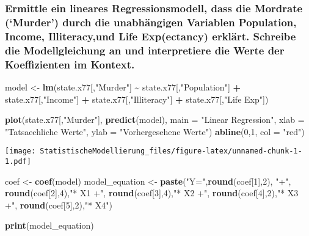 \documentclass[
]{article}
\newenvironment{Shaded}{\begin{snugshade}}{\end{snugshade}}
\newcommand{\AttributeTok}[1]{\textcolor[rgb]{0.13,0.29,0.53}{#1}}
\newcommand{\DecValTok}[1]{\textcolor[rgb]{0.00,0.00,0.81}{#1}}
\newcommand{\FunctionTok}[1]{\textcolor[rgb]{0.13,0.29,0.53}{\textbf{#1}}}
\newcommand{\NormalTok}[1]{#1}
\newcommand{\OtherTok}[1]{\textcolor[rgb]{0.56,0.35,0.01}{#1}}
\newcommand{\SpecialCharTok}[1]{\textcolor[rgb]{0.81,0.36,0.00}{\textbf{#1}}}
\newcommand{\StringTok}[1]{\textcolor[rgb]{0.31,0.60,0.02}{#1}}
\begin{document}
\subsubsection{Ermittle ein lineares Regressionsmodell, dass die
Mordrate (`Murder') durch die unabhängigen Variablen Population, Income,
Illiteracy,und Life Exp(ectancy) erklärt. Schreibe die Modellgleichung
an und interpretiere die Werte der Koeffizienten im
Kontext.}\label{ermittle-ein-lineares-regressionsmodell-dass-die-mordrate-murder-durch-die-unabhuxe4ngigen-variablen-population-income-illiteracyund-life-expectancy-erkluxe4rt.-schreibe-die-modellgleichung-an-und-interpretiere-die-werte-der-koeffizienten-im-kontext.}

\begin{Shaded}
\begin{Highlighting}[]
\NormalTok{model }\OtherTok{\textless{}{-}}  \FunctionTok{lm}\NormalTok{(state.x77[,}\StringTok{"Murder"}\NormalTok{] }\SpecialCharTok{\textasciitilde{}}\NormalTok{ state.x77[,}\StringTok{"Population"}\NormalTok{] }\SpecialCharTok{+}\NormalTok{ state.x77[,}\StringTok{"Income"}\NormalTok{] }\SpecialCharTok{+}\NormalTok{ state.x77[,}\StringTok{"Illiteracy"}\NormalTok{] }\SpecialCharTok{+}\NormalTok{ state.x77[,}\StringTok{"Life Exp"}\NormalTok{])}

\FunctionTok{plot}\NormalTok{(state.x77[,}\StringTok{"Murder"}\NormalTok{], }\FunctionTok{predict}\NormalTok{(model), }\AttributeTok{main =} \StringTok{"Linear Regression"}\NormalTok{, }\AttributeTok{xlab =} \StringTok{"Tatsaechliche Werte"}\NormalTok{, }\AttributeTok{ylab =} \StringTok{"Vorhergesehene Werte"}\NormalTok{)}
\FunctionTok{abline}\NormalTok{(}\DecValTok{0}\NormalTok{,}\DecValTok{1}\NormalTok{, }\AttributeTok{col =} \StringTok{"red"}\NormalTok{)}
\end{Highlighting}
\end{Shaded}

\texttt{[image: StatistischeModellierung\_files/figure-latex/unnamed-chunk-1-1.pdf]}

\begin{Shaded}
\begin{Highlighting}[]
\NormalTok{coef }\OtherTok{\textless{}{-}} \FunctionTok{coef}\NormalTok{(model)}
\NormalTok{model\_equation }\OtherTok{\textless{}{-}} \FunctionTok{paste}\NormalTok{(}\StringTok{"Y="}\NormalTok{,}\FunctionTok{round}\NormalTok{(coef[}\DecValTok{1}\NormalTok{],}\DecValTok{2}\NormalTok{), }\StringTok{"+"}\NormalTok{,}
                            \FunctionTok{round}\NormalTok{(coef[}\DecValTok{2}\NormalTok{],}\DecValTok{4}\NormalTok{),}\StringTok{"* X1 +"}\NormalTok{,}
                            \FunctionTok{round}\NormalTok{(coef[}\DecValTok{3}\NormalTok{],}\DecValTok{4}\NormalTok{),}\StringTok{"* X2 +"}\NormalTok{,}
                            \FunctionTok{round}\NormalTok{(coef[}\DecValTok{4}\NormalTok{],}\DecValTok{2}\NormalTok{),}\StringTok{"* X3 +"}\NormalTok{,}
                            \FunctionTok{round}\NormalTok{(coef[}\DecValTok{5}\NormalTok{],}\DecValTok{2}\NormalTok{),}\StringTok{"* X4"}\NormalTok{)}

\FunctionTok{print}\NormalTok{(model\_equation)}
\end{Highlighting}
\end{Shaded}
\end{document}
